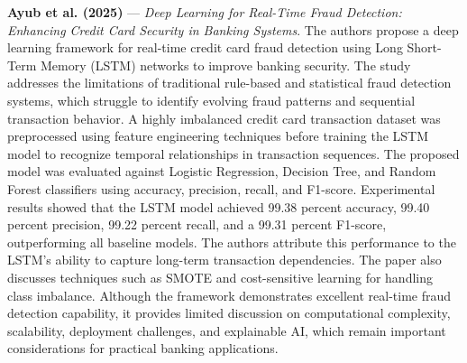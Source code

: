 \documentclass[conference]{IEEEtran}
\begin{document}
\noindent\textbf{Ayub et al. (2025)}\nocite{Ayub2025DeepLearningFraud} --- \emph{Deep Learning for Real-Time Fraud Detection: Enhancing Credit Card Security in Banking Systems}. The authors propose a deep learning framework for real-time credit card fraud detection using Long Short-Term Memory (LSTM) networks to improve banking security. The study addresses the limitations of traditional rule-based and statistical fraud detection systems, which struggle to identify evolving fraud patterns and sequential transaction behavior. A highly imbalanced credit card transaction dataset was preprocessed using feature engineering techniques before training the LSTM model to recognize temporal relationships in transaction sequences. The proposed model was evaluated against Logistic Regression, Decision Tree, and Random Forest classifiers using accuracy, precision, recall, and F1-score. Experimental results showed that the LSTM model achieved 99.38 percent accuracy, 99.40 percent precision, 99.22 percent recall, and a 99.31 percent F1-score, outperforming all baseline models. The authors attribute this performance to the LSTM's ability to capture long-term transaction dependencies. The paper also discusses techniques such as SMOTE and cost-sensitive learning for handling class imbalance. Although the framework demonstrates excellent real-time fraud detection capability, it provides limited discussion on computational complexity, scalability, deployment challenges, and explainable AI, which remain important considerations for practical banking applications.

\par\medskip
\end{document}
